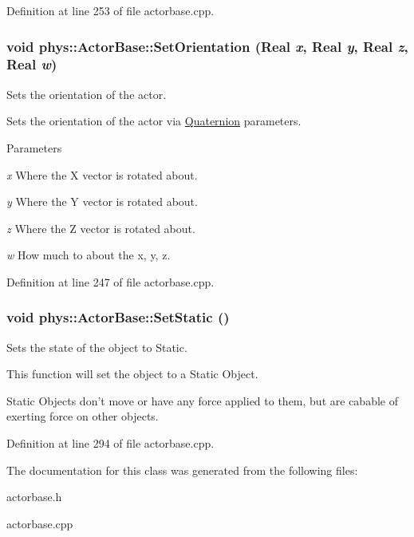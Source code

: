 Definition at line 253 of file actorbase.cpp.

\hypertarget{classphys_1_1ActorBase_adbf0cc77031f22597a799fd0f7f8216d}{
\subsubsection[{SetOrientation}]{\setlength{\rightskip}{0pt plus 5cm}void phys::ActorBase::SetOrientation ({\bf Real} {\em x}, \/  {\bf Real} {\em y}, \/  {\bf Real} {\em z}, \/  {\bf Real} {\em w})}}
\label{d8/d0f/classphys_1_1ActorBase_adbf0cc77031f22597a799fd0f7f8216d}


Sets the orientation of the actor. 

Sets the orientation of the actor via \hyperlink{classphys_1_1Quaternion}{Quaternion} parameters. 
\begin{DoxyParams}{Parameters}
\item[{\em x}]Where the X vector is rotated about. \item[{\em y}]Where the Y vector is rotated about. \item[{\em z}]Where the Z vector is rotated about. \item[{\em w}]How much to about the x, y, z. \end{DoxyParams}


Definition at line 247 of file actorbase.cpp.

\hypertarget{classphys_1_1ActorBase_af0219532fe71d1d84042a20a88fe5037}{
\subsubsection[{SetStatic}]{\setlength{\rightskip}{0pt plus 5cm}void phys::ActorBase::SetStatic ()}}
\label{d8/d0f/classphys_1_1ActorBase_af0219532fe71d1d84042a20a88fe5037}


Sets the state of the object to Static. 

This function will set the object to a Static Object. \par
 Static Objects don't move or have any force applied to them, but are cabable of exerting force on other objects. 

Definition at line 294 of file actorbase.cpp.



The documentation for this class was generated from the following files:\begin{DoxyCompactItemize}
\item 
actorbase.h\item 
actorbase.cpp\end{DoxyCompactItemize}
